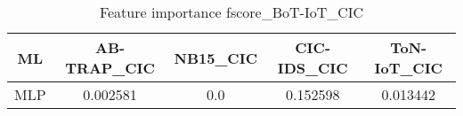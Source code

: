 \begin{table}[H]
\centering
\caption{Feature importance fscore_BoT-IoT_CIC}
\label{fscore_BoT-IoT_CIC}
\begin{tabular}{ccccc}
\toprule
 ML &  AB-TRAP\_CIC &  NB15\_CIC &  CIC-IDS\_CIC &  ToN-IoT\_CIC \\
\midrule
MLP &     0.002581 &       0.0 &     0.152598 &     0.013442 \\
\bottomrule
\end{tabular}
\end{table}
